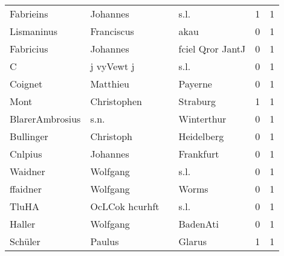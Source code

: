 \documentclass[10pt,a4paper,landscape]{article}
\begin{document}
\begin{longtable}{llllrr}
                Fabrieins &                           Johannes &             &                                        s.l. &          1 &         1 \\
               Lismaninus &                         Franciscus &             &                                        akau &          0 &         1 \\
                Fabricius &                           Johannes &             &                            fciel Qror JantJ &          0 &         1 \\
                        C &                         j vyVewt j &             &                                        s.l. &          0 &         1 \\
                  Coignet &                           Matthieu &             &                                     Payerne &          0 &         1 \\
                     Mont &                        Christophen &             &                                    Straburg &          1 &         1 \\
          BlarerAmbrosius &                               s.n. &             &                                  Winterthur &          0 &         1 \\
                Bullinger &                          Christoph &             &                                  Heidelberg &          0 &         1 \\
                  Cnlpius &                           Johannes &             &                                   Frankfurt &          0 &         1 \\
                  Waidner &                           Wolfgang &             &                                        s.l. &          0 &         1 \\
                 ffaidner &                           Wolfgang &             &                                       Worms &          0 &         1 \\
                    TluHA &                     OcLCok hcurhft &             &                                        s.l. &          0 &         1 \\
                   Haller &                           Wolfgang &             &                                    BadenAti &          0 &         1 \\
                  Schüler &                             Paulus &             &                                      Glarus &          1 &         1 \\

\end{longtable}
\end{document}
